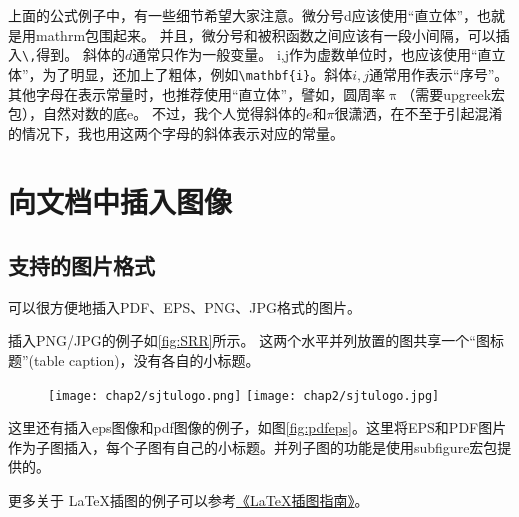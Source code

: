 上面的公式例子中，有一些细节希望大家注意。微分号d应该使用``直立体''，也就是用mathrm包围起来。
并且，微分号和被积函数之间应该有一段小间隔，可以插入\verb+\,+得到。
斜体的$d$通常只作为一般变量。
i,j作为虚数单位时，也应该使用``直立体''，为了明显，还加上了粗体，例如\verb+\mathbf{i}+。斜体$i,j$通常用作表示``序号''。
其他字母在表示常量时，也推荐使用``直立体''，譬如，圆周率$\uppi$（需要upgreek宏包），自然对数的底$\mathrm{e}$。
不过，我个人觉得斜体的$e$和$\pi$很潇洒，在不至于引起混淆的情况下，我也用这两个字母的斜体表示对应的常量。


\section{向文档中插入图像}
\label{sec:insertimage}

\subsection{支持的图片格式}
\label{sec:imageformat}

\XeTeX 可以很方便地插入PDF、EPS、PNG、JPG格式的图片。

插入PNG/JPG的例子如\ref{fig:SRR}所示。
这两个水平并列放置的图共享一个``图标题''(table caption)，没有各自的小标题。

\begin{figure}[!htp]
  \centering
  \texttt{[image: chap2/sjtulogo.png]}
  \hspace{1cm}
  \texttt{[image: chap2/sjtulogo.jpg]}
\end{figure}

这里还有插入eps图像和pdf图像的例子，如图\ref{fig:pdfeps}。这里将EPS和PDF图片作为子图插入，每个子图有自己的小标题。并列子图的功能是使用subfigure宏包提供的。

\begin{figure}
  \centering
  \hspace{1in}
\end{figure}

更多关于 \LaTeX 插图的例子可以参考\href{http://www.cs.duke.edu/junhu/Graphics3.pdf}{《\LaTeX 插图指南》}。

